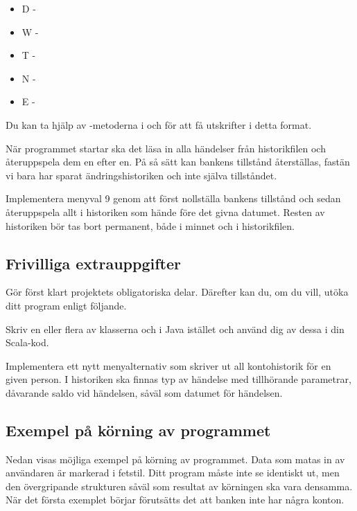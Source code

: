 \begin{itemize}
\item D - 
\item W - 
\item T - 
\item N - 
\item E - 
\end{itemize}

\noindent
Du kan ta hjälp av -metoderna i  och  för att få utskrifter i detta format.

\Subtask När programmet startar ska det läsa in alla händelser från historikfilen och återuppspela dem en efter en. På så sätt kan bankens tillstånd återställas, fastän vi bara har sparat ändringshistoriken och inte själva tillståndet.

\Task Implementera menyval 9 genom att först nollställa bankens tillstånd och sedan återuppspela allt i historiken som hände före det givna datumet. Resten av historiken bör tas bort permanent, både i minnet och i historikfilen.


\subsection{Frivilliga extrauppgifter}

Gör först klart projektets obligatoriska delar. Därefter kan du, om du vill, utöka ditt program enligt följande.

\Task Skriv en eller flera av klasserna  och  i Java istället och använd dig av dessa i din Scala-kod.

\Task	Implementera ett nytt menyalternativ som skriver ut all kontohistorik för en given person. I historiken ska finnas typ av händelse med tillhörande parametrar, dåvarande saldo vid händelsen, såväl som datumet för händelsen.

\subsection{Exempel på körning av programmet}

Nedan visas möjliga exempel på körning av programmet. Data som matas in av användaren är markerad i fetstil.
Ditt program måste inte se identiskt ut, men den övergripande strukturen såväl som resultat av körningen ska vara densamma.
När det första exemplet börjar förutsätts det att banken inte har några konton.

